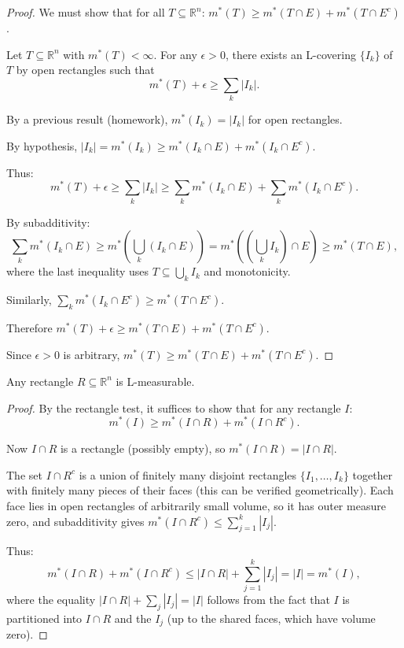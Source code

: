 \documentclass[11pt]{report}
\begin{document}
\begin{proof}
We must show that for all $T \subseteq \mathbb{R}^n$: $m^*(T) \geq m^*(T \cap E) + m^*(T \cap E^c)$.

Let $T \subseteq \mathbb{R}^n$ with $m^*(T) < \infty$. For any $\epsilon > 0$, there exists an L-covering $\{I_k\}$ of $T$ by open rectangles such that
\[
m^*(T) + \epsilon \geq \sum_k |I_k|.
\]

By a previous result (homework), $m^*(I_k) = |I_k|$ for open rectangles.

By hypothesis, $|I_k| = m^*(I_k) \geq m^*(I_k \cap E) + m^*(I_k \cap E^c)$.

Thus:
\[
m^*(T) + \epsilon \geq \sum_k |I_k| \geq \sum_k m^*(I_k \cap E) + \sum_k m^*(I_k \cap E^c).
\]

By subadditivity:
\[
\sum_k m^*(I_k \cap E) \geq m^*\left( \bigcup_k (I_k \cap E) \right) = m^*\left( \left( \bigcup_k I_k \right) \cap E \right) \geq m^*(T \cap E),
\]
where the last inequality uses $T \subseteq \bigcup_k I_k$ and monotonicity.

Similarly, $\sum_k m^*(I_k \cap E^c) \geq m^*(T \cap E^c)$.

Therefore $m^*(T) + \epsilon \geq m^*(T \cap E) + m^*(T \cap E^c)$.

Since $\epsilon > 0$ is arbitrary, $m^*(T) \geq m^*(T \cap E) + m^*(T \cap E^c)$.
\end{proof}

\begin{propbox}
Any rectangle $R \subseteq \mathbb{R}^n$ is L-measurable.
\end{propbox}

\begin{proof}
By the rectangle test, it suffices to show that for any rectangle $I$:
\[
m^*(I) \geq m^*(I \cap R) + m^*(I \cap R^c).
\]

Now $I \cap R$ is a rectangle (possibly empty), so $m^*(I \cap R) = |I \cap R|$.

The set $I \cap R^c$ is a union of finitely many disjoint rectangles $\{I_1, \ldots, I_k\}$ together with finitely many pieces of their faces (this can be verified geometrically). Each face lies in open rectangles of arbitrarily small volume, so it has outer measure zero, and subadditivity gives $m^*(I \cap R^c) \leq \sum_{j=1}^{k} |I_j|$.

Thus:
\[
m^*(I \cap R) + m^*(I \cap R^c) \leq |I \cap R| + \sum_{j=1}^{k} |I_j| = |I| = m^*(I),
\]
where the equality $|I \cap R| + \sum_j |I_j| = |I|$ follows from the fact that $I$ is partitioned into $I \cap R$ and the $I_j$ (up to the shared faces, which have volume zero).
\end{proof}
\end{document}
